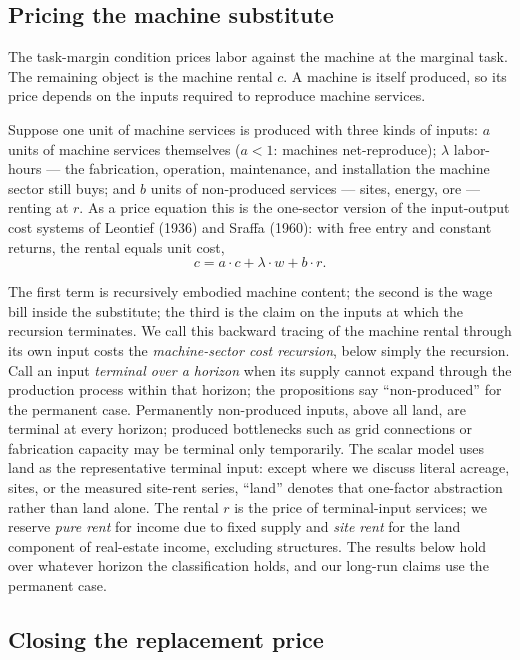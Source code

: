 \documentclass[12pt]{article}
\theoremstyle{plain}
\begin{document}
\subsection{Pricing the machine substitute}

The task-margin condition prices labor against the machine at the marginal task. The remaining object is the machine rental $c$. A machine is itself
produced, so its price depends on the inputs required to reproduce machine
services.

Suppose one unit of machine services is produced with three kinds of inputs:
$a$ units of machine services themselves ($a<1$: machines net-reproduce);
$\lambda$ labor-hours --- the fabrication, operation, maintenance, and
installation the machine sector still buys; and $b$ units of non-produced
services --- sites, energy, ore --- renting at $r$. As a price equation this is
the one-sector version of the input-output cost systems of Leontief (1936) and
Sraffa (1960): with free entry and constant returns, the rental equals unit cost,
\begin{equation}\label{eq:recursion}
c = a\cdot c + \lambda\cdot w + b\cdot r.
\end{equation}

The first term is recursively embodied machine content; the second is the wage
bill inside the substitute; the third is the claim on the inputs at which the
recursion terminates. We call this backward tracing of the machine rental
through its own input costs the \emph{machine-sector cost recursion}, below
simply the recursion. Call an input \emph{terminal over a horizon} when its
supply cannot expand through the production process within that horizon;
the propositions say ``non-produced'' for the permanent case. Permanently
non-produced inputs, above all land, are terminal at every horizon; produced
bottlenecks such as grid connections or fabrication capacity may be terminal
only temporarily. The scalar model uses land as the representative terminal
input: except where we discuss literal acreage, sites, or the measured
site-rent series, ``land'' denotes that one-factor abstraction rather than
land alone. The rental $r$ is the price of terminal-input services; we
reserve \emph{pure rent} for income due to fixed supply and \emph{site rent}
for the land component of real-estate income, excluding structures.
 The results below hold over whatever horizon the classification holds,
and our long-run claims use the permanent case.


\subsection{Closing the replacement price}
\end{document}
